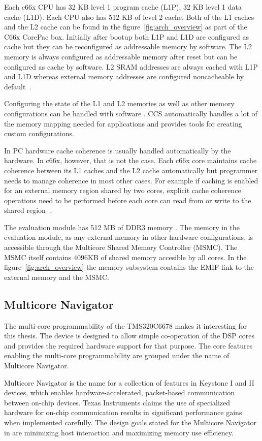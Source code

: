 Each c66x CPU has 32 KB level 1 program cache (L1P), 32 KB level 1 data cache (L1D). Each CPU also has 512 KB of level 2 cache. Both of the L1 caches and the L2 cache can be found in the figure~\ref{fig:arch_overview} as part of the C66x CorePac box. Initially after bootup both L1P and L1D are configured as cache but they can be reconfigured as addressable memory by software. The L2 memory is always configured as addressable memory after reset but can be configured as cache by software. \cite{tmsdatasheet} L2 SRAM addresses are always cached with L1P and L1D whereas external memory addresses are configured noncacheable by default~\cite{cacheguide}.

Configuring the state of the L1 and L2 memories as well as other memory configurations can be handled with software \cite{sprugh7}. CCS automatically handles a lot of the memory mapping needed for applications and provides tools for creating custom configurations.

In PC hardware cache coherence is usually handled automatically by the hardware. In c66x, however, that is not the case. Each c66x core maintains cache coherence between its L1 caches and the L2 cache automatically but programmer needs to manage coherence in most other cases. For example if caching is enabled for an external memory region shared by two cores, explicit cache coherence operations need to be performed before each core can read from or write to the shared region~\cite{cacheguide}.

The evaluation module has 512 MB of DDR3 memory \cite{evmref}. The memory in the evaluation module, as any external memory in other hardware configurations, is accessible through the Multicore Shared Memory Controller (MSMC). The MSMC itself contains 4096KB of shared memory accesible by all cores. In the figure~\ref{fig:arch_overview} the memory subsystem contains the EMIF link to the external memory and the MSMC.

\subsection{Multicore Navigator}
\label{subsec:multicorenav}
The multi-core programmability of the TMS320C6678 makes it interesting for this thesis. The device is designed to allow simple co-operation of the DSP cores and provides the required hardware support for that purpose. The core features enabling the multi-core programmability are grouped under the name of Multicore Navigator.

Multicore Navigator is the name for a collection of features in Keystone I and II devices, which enables hardware-accelerated, packet-based communication between on-chip devices. Texas Instruments claims the use of specialized hardware for on-chip communication results in significant performance gains when implemented carefully. The design goals stated for the Multicore Navigator in \cite{navigator} are minimizing host interaction and maximizing memory use efficiency.~\cite{navigator}

